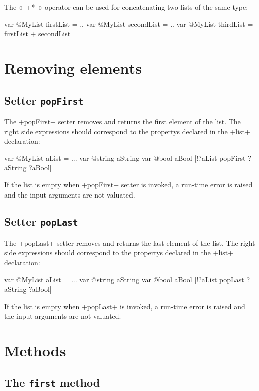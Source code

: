 The «~\ggs*+*~» operator can be used for concatenating two lists of the same type:


\begin{galgas}
var @MyList firstList = ..
var @MyList secondList = ..
var @MyList thirdList = firstList + secondList
\end{galgas}

\section{Removing elements}

\subsection{Setter \texttt{popFirst}}


The \ggs+popFirst+ setter removes and returns the first element of the list. The right side expressions should correspond to the propertys declared in the \ggs+list+ declaration:

\begin{galgas}
var @MyList aList = ...
var @string aString
var @bool aBool
[!?aList popFirst ?aString ?aBool]
\end{galgas}

If the list is empty when \ggs+popFirst+ setter is invoked, a run-time error is raised and the input arguments are not valuated.

\subsection{Setter \texttt{popLast}}


The \ggs+popLast+ setter removes and returns the last element of the list. The right side expressions should correspond to the propertys declared in the \ggs+list+ declaration:

\begin{galgas}
var @MyList aList = ...
var @string aString
var @bool aBool
[!?aList popLast ?aString ?aBool]
\end{galgas}

If the list is empty when \ggs+popLast+ is invoked, a run-time error is raised and the input arguments are not valuated.

\section{Methods}

\subsection{The \texttt{first} method}

